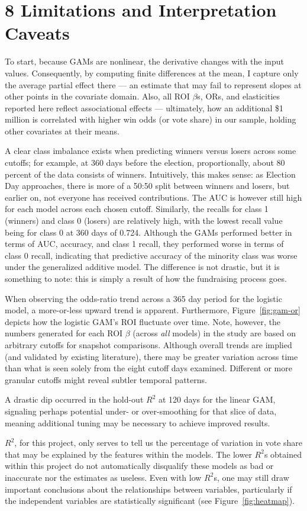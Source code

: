 \section*{8 Limitations and Interpretation Caveats}

To start, because GAMs are nonlinear, the derivative changes with the input values. Consequently, by computing finite differences at the mean, I capture only the average partial effect there --- an estimate that may fail to represent slopes at other points in the covariate domain. Also, all ROI $\beta$s, ORs, and elasticities reported here reflect associational effects --- ultimately, how an additional \$1 million is correlated with higher win odds (or vote share) in our sample, holding other covariates at their means. 

\indent A clear class imbalance exists when predicting winners versus losers across some cutoffs; for example, at $360$ days before the election, proportionally, about 80 percent of the data consists of winners. Intuitively, this makes sense: as Election Day approaches, there is more of a 50:50 split between winners and losers, but earlier on, not everyone has received contributions. The AUC is however still high for each model across each chosen cutoff. Similarly, the recalls for class 1 (winners) and class 0 (losers) are relatively high, with the lowest recall value being for class 0 at 360 days of 0.724. Although the GAMs performed better in terms of AUC, accuracy, and class 1 recall, they performed worse in terms of class 0 recall, indicating that predictive accuracy of the minority class was worse under the generalized additive model. The difference is not drastic, but it is something to note: this is simply a result of how the fundraising process goes.

\indent When observing the odds-ratio trend across a 365 day period for the logistic model, a more-or-less upward trend is apparent. Furthermore, Figure~\ref{fig:gam-or} depicts how the logistic GAM's ROI fluctuate over time. Note, however, the numbers generated for each ROI $\beta$ (across \textit{all} models) in the study are based on arbitrary cutoffs for snapshot comparisons. Although overall trends are implied (and validated by existing literature), there may be greater variation across time than what is seen solely from the eight cutoff days examined. Different or more granular cutoffs might reveal subtler temporal patterns.

\indent A drastic dip occurred in the hold-out $R^2$ at 120 days for the linear GAM, signaling perhaps potential under- or over-smoothing for that slice of data, meaning additional tuning may be necessary to achieve improved results.

\indent $R^2$, for this project, only serves to tell us the percentage of variation in vote share that may be explained by the features within the models. The lower $R^2$s obtained within this project do not automatically disqualify these models as bad or inaccurate nor the estimates as useless. Even with low $R^2$s, one may still draw important conclusions about the relationships between variables, particularly if the independent variables are statistically significant (see Figure~\ref{fig:heatmap}).
